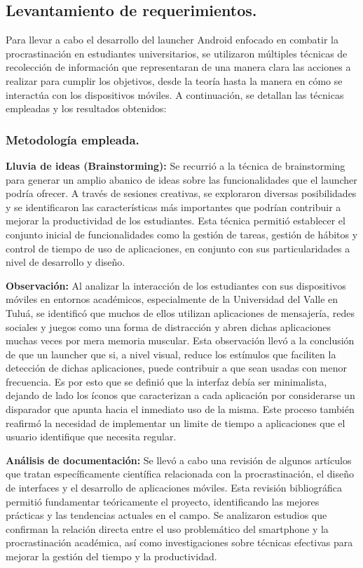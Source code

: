 \subsection{Levantamiento de requerimientos.}

Para llevar a cabo el desarrollo del launcher Android enfocado en combatir la procrastinación en estudiantes universitarios, se utilizaron múltiples técnicas de recolección de información que representaran de una manera clara las acciones a realizar para cumplir los objetivos, desde la teoría hasta la manera en cómo se interactúa con los dispositivos móviles. A continuación, se detallan las técnicas empleadas y los resultados obtenidos:

\subsubsection{Metodología empleada.}

\textbf{Lluvia de ideas (Brainstorming):} Se recurrió a la técnica de brainstorming para generar un amplio abanico de ideas sobre las funcionalidades que el launcher podría ofrecer. A través de sesiones creativas, se exploraron diversas posibilidades y se identificaron las características más importantes que podrían contribuir a mejorar la productividad de los estudiantes. Esta técnica permitió establecer el conjunto inicial de funcionalidades como la gestión de tareas, gestión de hábitos y control de tiempo de uso de aplicaciones, en conjunto con sus particularidades a nivel de desarrollo y diseño.

\textbf{Observación:} Al analizar la interacción de los estudiantes con sus dispositivos móviles en entornos académicos, especialmente de la Universidad del Valle en Tuluá, se identificó que muchos de ellos utilizan aplicaciones de mensajería, redes sociales y juegos como una forma de distracción y abren dichas aplicaciones muchas veces por mera memoria muscular. Esta observación llevó a la conclusión de que un launcher que si, a nivel visual, reduce los estímulos que faciliten la detección de dichas aplicaciones, puede contribuir a que sean usadas con menor frecuencia. Es por esto que se definió que la interfaz debía ser minimalista, dejando de lado los íconos que caracterizan a cada aplicación por considerarse un disparador que apunta hacia el inmediato uso de la misma. Este proceso también reafirmó la necesidad de implementar un limite de tiempo a aplicaciones que el usuario identifique que necesita regular.

\textbf{Análisis de documentación:} Se llevó a cabo una revisión de algunos artículos que tratan específicamente  científica relacionada con la procrastinación, el diseño de interfaces y el desarrollo de aplicaciones móviles. Esta revisión bibliográfica permitió fundamentar teóricamente el proyecto, identificando las mejores prácticas y las tendencias actuales en el campo. Se analizaron estudios que confirman la relación directa entre el uso problemático del smartphone y la procrastinación académica, así como investigaciones sobre técnicas efectivas para mejorar la gestión del tiempo y la productividad.

